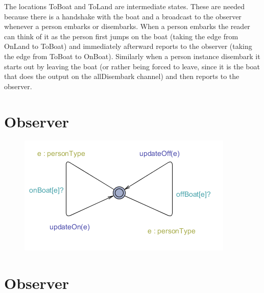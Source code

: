 The locations ToBoat and ToLand are intermediate states.
These are needed because there is a handshake with the boat and a broadcast to the observer whenever a person embarks or disembarks.
When a person embarks the reader can think of it as the person first jumps on the boat (taking the edge from OnLand to ToBoat) and immediately afterward reports to the observer (taking the edge from ToBoat to OnBoat).
Similarly when a person instance disembark it starts out by leaving the boat (or rather being forced to leave, since it is the boat that does the output on the allDisembark channel) and then reports to the observer.
















\section{Observer}
\begin{figure}%
\includegraphics[width=\columnwidth]{pictures/observer.png}%
\caption{}%
\label{}%
\end{figure}




























\section{Observer}